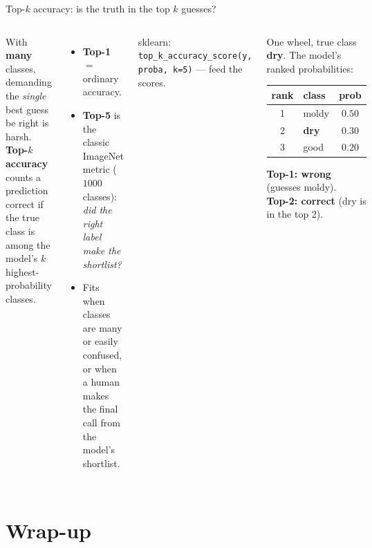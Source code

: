 \documentclass[aspectratio=169]{beamer}
\begin{document}
\begin{frame}{Top-$k$ accuracy: is the truth in the top $k$ guesses?}
  \begin{columns}[T]
    With \textbf{many} classes, demanding the \emph{single} best guess be right is harsh.
    \textbf{Top-$k$ accuracy} counts a prediction correct if the true class is among the model's
    $k$ highest-probability classes.
    \begin{itemize}\small
      \item \textbf{Top-1} $=$ ordinary accuracy.
      \item \textbf{Top-5} is the classic ImageNet metric ($1000$ classes): \emph{did the right
        label make the shortlist?}
      \item Fits when classes are many or easily confused, or when a human makes the final call
        from the model's shortlist.
    \end{itemize}
    \vskip 2pt
    \footnotesize sklearn: \texttt{top\_k\_accuracy\_score(y, proba, k=5)} --- feed the scores.
    \begin{center}\small
    One wheel, true class \textbf{dry}. The model's ranked probabilities:
    \vskip 3pt
    \renewcommand{\arraystretch}{1.25}
    \begin{tabular}{c l c}
      rank & class & prob \\
      \hline
      1 & moldy & $0.50$ \\
      2 & \textbf{dry} & $0.30$ \\
      3 & good & $0.20$ \\
      \hline
    \end{tabular}
    \vskip 5pt
    \textcolor{armred}{\textbf{Top-1: wrong}} (guesses moldy).\\
    \textcolor{paramgreen!60!black}{\textbf{Top-2: correct}} (dry is in the top 2).
    \end{center}
  \end{columns}
\end{frame}

\section{Wrap-up}
\end{document}

